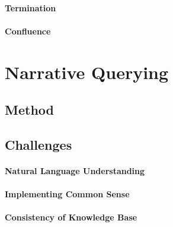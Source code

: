\paragraph{Termination}

\paragraph{Confluence}

\section{Narrative Querying}\label{sec:bolquery:narr}

\subsection{Method}

\subsection{Challenges}

\paragraph{Natural Language Understanding}

\paragraph{Implementing Common Sense}

\paragraph{Consistency of Knowledge Base}




